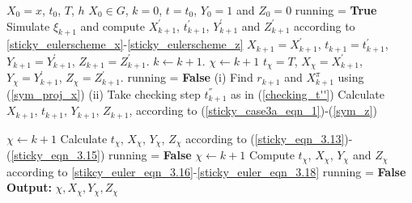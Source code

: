 \documentclass{article}
\theoremstyle{definition}
\numberwithin{equation}{section}
\begin{document}
\begin{algorithm}[htbp]
\small  %
\setlength{\baselineskip}{0.9\baselineskip}
\caption{Sticky Euler method}\label{sticky_euler_method}
\begin{algorithmic}
\Require $X_0 = x$,  $t_0$, $T$, $h$
\Ensure $X_0 \in G$, $k = 0$, $ t = t_0$, $Y_0 = 1$ and $Z_0 = 0$
\State running = \textbf{True}
\State Simulate $ \xi_{k+1} $ 
and compute $X^{'}_{k+1}$, $t_{k+1}^{'}$,  $Y_{k+1}^{'}$ and $Z_{k+1}^{'}$ according to \eqref{sticky_eulerscheme_x}-\eqref{sticky_eulerscheme_z}
    \State  $X_{k+1} = X^{'}_{k+1}$, $t_{k+1} = t_{k+1}^{'}$,   $Y_{k+1} =Y_{k+1}^{'}$, $Z_{k+1} = Z_{k+1}^{'}$.
    \State $k \gets k+1$.
\State $\chi \gets k+1$
\State $t_\chi = T$, $X_{\chi} = X^{'}_{k+1}$, $Y_{\chi } = Y_{k+1}^{'}$, $Z_{\chi} = Z_{k+1}^{'}$. 
\State running = \textbf{False}
    \State (i) Find $r_{k+1}$ and $X_{k+1}^{\pi}$ using (\ref{sym_proj_x})
    \State (ii) Take checking step $ t^{''}_{k+1}$ as in (\ref{checking_t''})
    \State Calculate $X_{k+1}$, $t_{k+1}$, $Y_{k+1}$, $Z_{k+1}$,  according to (\ref{sticky_case3a_eqn_1})-(\ref{sym_z})

    \Else
    \State $\chi \gets k+1$
      \State Calculate $t_{\chi}$, $X_{\chi}$, $Y_{\chi}$, $Z_{\chi}$ according to (\ref{sticky_eqn_3.13})-(\ref{sticky_eqn_3.15})
      \State running = \textbf{False}      
    \EndIf     
    \State $\chi \gets k+1$
    \State Compute $t_\chi$, $X_{\chi}$, $Y_{\chi}$ and $Z_{\chi}$ according to \eqref{stikcy_euler_eqn_3.16}-\eqref{sticky_euler_eqn_3.18} 
    \State running = \textbf{False}
\EndIf
\EndWhile  
\State \textbf{Output:} $ \chi, X_\chi, Y_\chi, Z_\chi$ 
\end{algorithmic}

\end{algorithm}
\setlength{\belowcaptionskip}{5pt}
\end{document}
